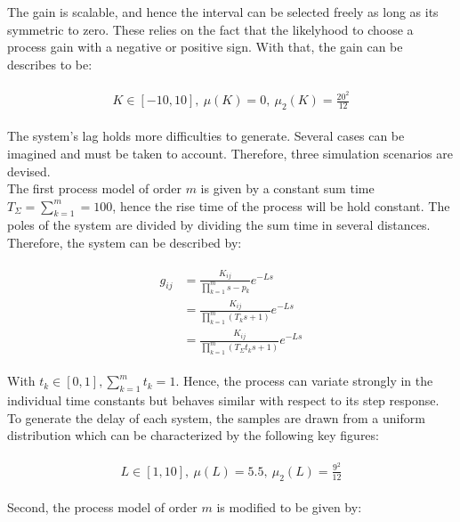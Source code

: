 The gain is scalable, and hence the interval can be selected freely as long as its symmetric to zero. These relies on the fact that the likelyhood to choose a process gain with a negative or positive sign. With that, the gain can be describes to be:

\begin{align*}
\begin{split}
K \in \left[ -10, 10\right],~\mu\left( K \right) = 0,~\mu_2\left(K\right) = \frac{20^2}{12}
\end{split}
\end{align*}

The system's lag holds more difficulties to generate. Several cases can be imagined and must be taken to account. Therefore, three simulation scenarios are devised.\\

The first process model of order $m$ is given by a constant sum time $T_\Sigma = \sum_{k=1}^m= 100$, hence the rise time of the process will be hold constant. The poles of the system are divided by dividing the sum time in several distances. Therefore, the system can be described by:

\begin{align*}
\begin{split}
g_{ij} &= \frac{K_{ij}}{\prod_{k=1}^{m} s - p_k} e^{-Ls} \\
&= \frac{K_{ij}}{\prod_{k=1}^{m} \left( T_k s +1 \right)} e^{-Ls} \\
&= \frac{K_{ij}}{\prod_{k=1}^{m} \left(T_\Sigma  t_k s +1 \right)} e^{-Ls}
\end{split}
\end{align*}

With $t_k \in \left[ 0,1\right], \sum_{k=1}^m t_k = 1$. Hence, the process can variate strongly in the individual time constants but behaves similar with respect to its step response.\\

To generate the delay of each system, the samples are drawn from a uniform distribution which can be characterized by the following key figures:

\begin{align*}
\begin{split}
L \in \left[ 1 , 10 \right],~\mu\left( L \right) = 5.5,~\mu_2\left(L\right) = \frac{9^2}{12}
\end{split}
\end{align*}

Second, the process model of order $m$ is modified to be given by:

